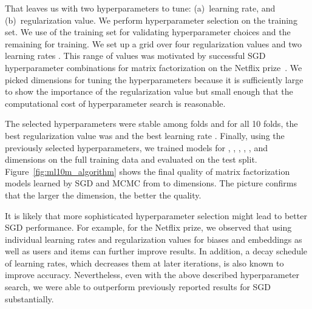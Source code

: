 \documentclass{article}
\begin{document}
That leaves us with two hyperparameters to tune: (a)~learning rate, and (b)~regularization value.
We perform hyperparameter selection on the training set.
We use  of the training set for validating hyperparameter choices and the remaining  for training.
We set up a grid over four regularization values  and two learning rates .
This range of values was motivated by successful SGD hyperparameter combinations for matrix factorization on the Netflix prize~\cite{paterek:kddcup07,koren:kdd08}.
We picked  dimensions for tuning the hyperparameters because it is sufficiently large to show the importance of the regularization value but small enough that the computational cost of hyperparameter search is reasonable.

The selected hyperparameters were stable among folds and for all 10 folds, the best regularization value was  and the best learning rate .
Finally, using the previously selected hyperparameters, we trained models for , , , , , and  dimensions on the full training data and evaluated on the  test split.
Figure~\ref{fig:ml10m_algorithm} shows the final quality of matrix factorization models learned by SGD and MCMC from  to  dimensions.
The picture confirms that the larger the dimension, the better the quality.

It is likely that more sophisticated hyperparameter selection might lead to better SGD performance.
For example, for the Netflix prize, we observed that using individual learning rates and regularization values for biases and embeddings as well as users and items can further improve results. In addition, a decay schedule of learning rates, which decreases them at later iterations, is also known to improve accuracy.
Nevertheless, even with the above described hyperparameter search, we were able to outperform previously reported results for SGD substantially.
\end{document}
